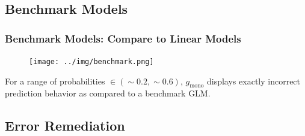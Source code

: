 \documentclass[11pt,
               aspectratio=169,
               hyperref={colorlinks}
               ]{beamer}
\begin{document}
		\subsection{Benchmark Models}

			\begin{frame}
		
				\frametitle{\textbf{Benchmark Models}: Compare to Linear Models}
				\begin{figure}
					\begin{center}
						\texttt{[image: ../img/benchmark.png]}
					\end{center}
				\end{figure}	
				\vspace{-10pt}
				For a range of probabilities $\in  (\sim0.2, \sim0.6)$, $g_{\text{mono}}$ displays exactly incorrect prediction behavior as compared to a benchmark GLM.
			\end{frame}

		\subsection{Error Remediation}
\end{document}
